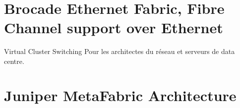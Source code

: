 






\section{Brocade Ethernet Fabric, Fibre Channel support over Ethernet}
Virtual Cluster Switching
Pour les architectes du réseau et serveurs de data centre.


\section{Juniper MetaFabric Architecture}

